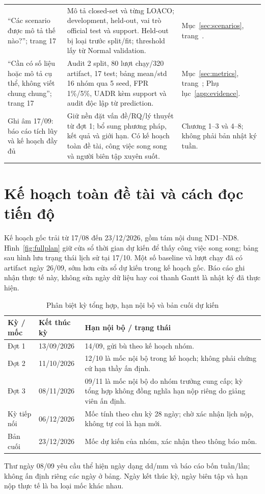 \documentclass[12pt,a4paper,oneside]{report}
\begin{document}
\begin{longtable}{L{3.4cm}L{8.2cm}L{4.1cm}}
``Các scenario được mô tả thế nào?''; trang 17 & Mô tả closed-set và từng LOACO; development, held-out, vai trò official test và support. Held-out bị loại trước split/fit; threshold lấy từ Normal validation. & Mục~\ref{sec:scenarios}, trang~\pageref{sec:scenarios}.\\
``Cần có số liệu hoặc mô tả cụ thể, không viết chung chung''; trang 17 & Audit 2 split, 80 lượt chạy/320 artifact, 17 test; bảng mean/std 16 nhóm qua 5 seed, FPR 1\%/5\%, UADR kèm support và audit độc lập từ prediction. & Mục~\ref{sec:metrics}, trang~\pageref{sec:metrics}; Phụ lục~\ref{app:evidence}.\\
Ghi âm 17/09: báo cáo tích lũy và kế hoạch đầy đủ & Giữ nền đặt vấn đề/RQ/lý thuyết từ đợt 1; bổ sung phương pháp, kết quả và giới hạn. Có kế hoạch toàn đề tài, công việc song song và người biên tập xuyên suốt. & Chương 1--3 và 4--8; không phải bản nhật ký tuần.\\
\bottomrule\end{longtable}\endgroup

\section{Kế hoạch toàn đề tài và cách đọc tiến độ}\label{sec:progress}
Kế hoạch gốc trải từ 17/08 đến 23/12/2026, gồm tám nội dung ND1--ND8. Hình~\ref{fig:fullplan} giữ cửa sổ thời gian dự kiến để thấy công việc song song; bảng sau hình lưu trạng thái lịch sử tại 17/10. Một số baseline và lượt chạy đã có artifact ngày 26/09, sớm hơn cửa sổ dự kiến trong kế hoạch gốc. Báo cáo ghi nhận thực tế này, không sửa ngày dữ liệu hay coi thanh Gantt là nhật ký đã thực hiện.



\begin{table}[H]\centering\small
\caption{Phân biệt kỳ tổng hợp, hạn nội bộ và bản cuối dự kiến}
\begin{tabularx}{\textwidth}{L{2.0cm}L{3.8cm}Y}\toprule
Kỳ / mốc & Kết thúc kỳ & Hạn nội bộ / trạng thái\\\midrule
Đợt 1 & 13/09/2026 & 14/09, gửi bù theo kế hoạch nhóm.\\
Đợt 2 & 11/10/2026 & 12/10 là mốc nội bộ trong kế hoạch; không phải chứng cứ hạn thầy ấn định.\\
Đợt 3 & 08/11/2026 & 09/11 là mốc nội bộ do nhóm trưởng cung cấp; kỳ tổng hợp không đồng nghĩa hạn nộp riêng do giảng viên ấn định.\\
Kỳ tiếp nối & 06/12/2026 & Mốc tính theo chu kỳ 28 ngày; chờ xác nhận lịch nộp, không tự coi là hạn mới.\\
Bản cuối & 23/12/2026 & Mốc dự kiến của nhóm, xác nhận theo thông báo môn.\\
\bottomrule\end{tabularx}\end{table}
Thư ngày 08/09 yêu cầu thể hiện ngày dạng dd/mm và báo cáo bốn tuần/lần; không ấn định riêng các ngày ở bảng. Ngày kết thúc kỳ, ngày biên tập và hạn nộp thực tế là ba loại mốc khác nhau.
\end{document}
